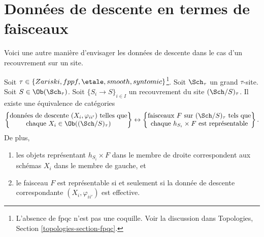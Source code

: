 











\section{Données de descente en termes de faisceaux}
\label{section-descent-data-sheaves}


\noindent
Voici une autre manière d'envisager les données de descente dans le cas d'un
recouvrement sur un site.

\begin{lemma}
\label{lemma-descent-data-sheaves}
Soit $\tau \in \{Zariski, fppf, \etale, smooth, syntomic\}$\footnote{L'absence
de fpqc n'est pas une coquille. Voir la discussion dans Topologies,
Section \ref{topologies-section-fpqc}.}. Soit $\Sch_\tau$ un grand
$\tau$-site. Soit $S \in \Ob(\Sch_\tau)$. Soit
$\{S_i \to S\}_{i \in I}$ un recouvrement du site $(\Sch/S)_\tau$. Il existe
une équivalence de catégories
$$
\left\{
\begin{matrix}
\text{données de descente }(X_i, \varphi_{ii'})\text{ telles que}\\
\text{chaque }X_i \in \Ob((\Sch/S)_\tau)
\end{matrix}
\right\}
\leftrightarrow
\left\{
\begin{matrix}
\text{faisceaux }F\text{ sur }(\Sch/S)_\tau\text{ tels que}\\
\text{chaque }h_{S_i} \times F\text{ est représentable}
\end{matrix}
\right\}.
$$
De plus,
\begin{enumerate}
\item les objets représentant $h_{S_i} \times F$ dans le membre de droite
correspondent aux schémas $X_i$ dans le membre de gauche, et
\item le faisceau $F$ est représentable si et seulement si la donnée de
descente correspondante $(X_i, \varphi_{ii'})$ est effective.
\end{enumerate}
\end{lemma}

